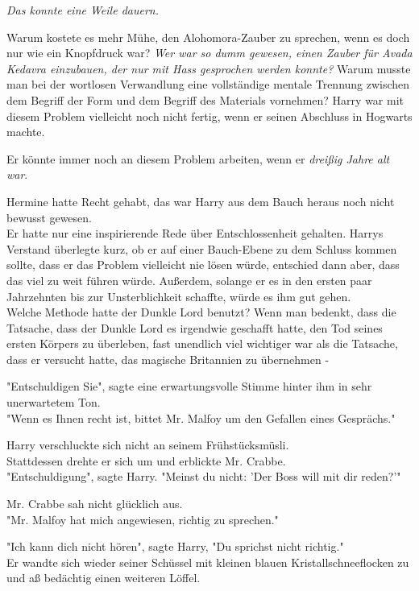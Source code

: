 {\emph{Das konnte eine Weile dauern.}

Warum kostete es mehr Mühe, den Alohomora-Zauber zu sprechen, wenn es doch nur wie ein Knopfdruck war? \emph{Wer war so dumm gewesen, einen Zauber für Avada Kedavra einzubauen, der nur mit Hass gesprochen werden konnte?} Warum musste man bei der wortlosen Verwandlung eine vollständige mentale Trennung zwischen dem Begriff der Form und dem Begriff des Materials vornehmen? Harry war mit diesem Problem vielleicht noch nicht fertig, wenn er seinen Abschluss in Hogwarts machte.

Er könnte immer noch an diesem Problem arbeiten, wenn er \emph{dreißig Jahre alt war}.

Hermine hatte Recht gehabt, das war Harry aus dem Bauch heraus noch nicht bewusst gewesen.\\ Er hatte nur eine inspirierende Rede über Entschlossenheit gehalten. Harrys Verstand überlegte kurz, ob er auf einer Bauch-Ebene zu dem Schluss kommen sollte, dass er das Problem vielleicht nie lösen würde, entschied dann aber, dass das viel zu weit führen würde. Außerdem, solange er es in den ersten paar Jahrzehnten bis zur Unsterblichkeit schaffte, würde es ihm gut gehen.\\ Welche Methode hatte der Dunkle Lord benutzt? Wenn man bedenkt, dass die Tatsache, dass der Dunkle Lord es irgendwie geschafft hatte, den Tod seines ersten Körpers zu überleben, fast unendlich viel wichtiger war als die Tatsache, dass er versucht hatte, das magische Britannien zu übernehmen -

"Entschuldigen Sie", sagte eine erwartungsvolle Stimme hinter ihm in sehr unerwartetem Ton.\\ "Wenn es Ihnen recht ist, bittet Mr. Malfoy um den Gefallen eines Gesprächs."

Harry verschluckte sich nicht an seinem Frühstücksmüsli.\\ Stattdessen drehte er sich um und erblickte Mr. Crabbe.\\ "Entschuldigung", sagte Harry. "Meinst du nicht: 'Der Boss will mit dir reden?'"

Mr. Crabbe sah nicht glücklich aus.\\ "Mr. Malfoy hat mich angewiesen, richtig zu sprechen."

"Ich kann dich nicht hören", sagte Harry, "Du sprichst nicht richtig."\\ Er wandte sich wieder seiner Schüssel mit kleinen blauen Kristallschneeflocken zu und aß bedächtig einen weiteren Löffel.

}
